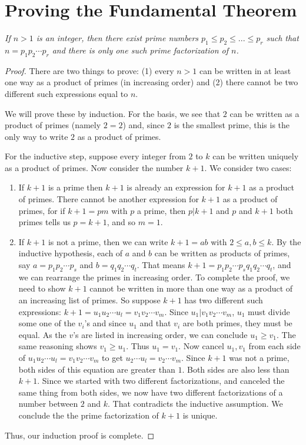 \section{Proving the Fundamental Theorem}
\begin{thm}
{\it {If $n>1$ is an integer, then there  
exist prime numbers $p_1\leq p_2\leq...\leq p_r$ such that 
$n=p_1 p_2\cdots p_r$
and there is only one such prime factorization of $n$.}}
\end{thm}
\begin{proof}
There are two things to prove: (1) every $n>1$ can
be written in at least one way as a product of primes (in increasing order)
and (2) there cannot be two different such expressions equal to $n$.

We will prove these by induction. For the basis, we see that
$2$ can be written as a product of primes (namely $2=2$) and,
since $2$ is the smallest prime, this is the only way to write $2$
as a product of primes.

For the inductive step, suppose every integer from $2$ to $k$
can be written uniquely as a product of primes. Now consider
the number $k+1$.  We consider two cases:
\begin{enumerate}
 \item
 If $k+1$ is a prime then $k+1$ is already
 an expression for $k+1$ as a product of primes. There
 cannot be another expression for $k+1$ as a product of
 primes, for if $k+1 = pm$ with $p$ a prime, then $p|k+1$
 and $p$ and $k+1$ both primes tells us $p=k+1$, and so $m=1$.
 
 \item If $k+1$ is not a prime, then we can write
 $k+1 = ab$ with $2\leq a,b\leq k$. By the inductive hypothesis,
 each of $a$ and $b$ can be written as products of primes, 
 say $a=p_1p_2\cdots p_s$ and $b=q_1q_2\cdots q_t$. That
 means $k+1 = p_1p_2\cdots p_sq_1q_2\cdots q_t$, and
 we can rearrange the primes in increasing order.
 To complete the proof, we need to show $k+1$ cannot be written
 in more than one way as a product of an increasing list of primes. So
 suppose $k+1$ has two different such  expressions:
 $k+1 = u_1u_2\cdots u_l = v_1v_2\cdots v_m$. Since
  $u_1|  v_1v_2\cdots v_m$, $u_1$ must divide some one of the
 $v_i$'s and since $u_1$ and that $v_i$ are both primes, they
 must be equal. As the $v$'s are listed in increasing order, we can
 conclude $u_1\geq v_1$. The same reasoning shows $v_1\geq u_1$.
 Thus $u_1=v_1$. Now cancel $u_1, v_1$ from each side of
 $u_1u_2\cdots u_l = v_1v_2\cdots v_m$
 to get $u_2\cdots u_l = v_2\cdots v_m$. Since $k+1$ was not a prime,
 both sides of this equation are greater than $1$. Both sides are 
 also less than $k+1$. Since we started with two different factorizations,
 and canceled the same thing from both sides, we now have two
 different factorizations of a number between $2$ and $k$. That
 contradicts the inductive assumption. We conclude the the 
 prime factorization of $k+1$ is unique. 
\end{enumerate}
Thus, our induction proof is complete.
\end{proof}


